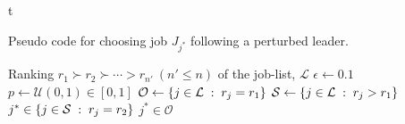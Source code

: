 t\begin{algorithm}[t]
    \caption[Perturbed leader]{Pseudo code for choosing job 
    $J_{j^*}$ following a perturbed leader.}
    \label{pseudo:perturbedLeader}
    \begin{algorithmic}[1]
        \Require Ranking $r_1 \succ r_2 \succ \cdots > r_{n'} ~ (n' \leq n)$ of 
        the job-list, $\mathcal{L}$ 
        \State $\epsilon \gets 0.1$ 
        \State $p \gets \mathcal{U}(0,1)\in [0,1]$
        \State $\mathcal{O} \gets \left\{j\in\mathcal{L}\;:\;r_j=r_1\right\}$ 
        \State $\mathcal{S} \gets \left\{j\in\mathcal{L}\;:\;r_j>r_1\right\}$
        \State \Return $j^* \in \left\{j\in\mathcal{S}\;:\;r_j=r_2\right\}$ 
        \Else 
        \State \Return $j^* \in\mathcal{O}$ 
        \EndIf
        \EndProcedure
    \end{algorithmic}
\end{algorithm}